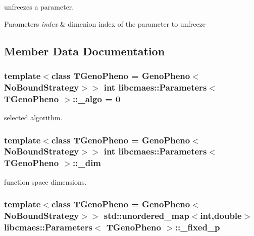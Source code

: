 unfreezes a parameter. 


\begin{DoxyParams}{Parameters}
{\em index} & dimenion index of the parameter to unfreeze \\
\hline
\end{DoxyParams}


\subsection{Member Data Documentation}
\hypertarget{classlibcmaes_1_1Parameters_a7a5fc681b0c7294ef050ace344f923db}{
\subsubsection[{\-\_\-algo}]{\setlength{\rightskip}{0pt plus 5cm}template$<$class T\-Geno\-Pheno = Geno\-Pheno$<$\-No\-Bound\-Strategy$>$$>$ int {\bf libcmaes\-::\-Parameters}$<$ T\-Geno\-Pheno $>$\-::\-\_\-algo = 0}}\label{classlibcmaes_1_1Parameters_a7a5fc681b0c7294ef050ace344f923db}
selected algorithm. \hypertarget{classlibcmaes_1_1Parameters_affc62ae5c5f1db4f88e4c2dc96387af6}{
\subsubsection[{\-\_\-dim}]{\setlength{\rightskip}{0pt plus 5cm}template$<$class T\-Geno\-Pheno = Geno\-Pheno$<$\-No\-Bound\-Strategy$>$$>$ int {\bf libcmaes\-::\-Parameters}$<$ T\-Geno\-Pheno $>$\-::\-\_\-dim}}\label{classlibcmaes_1_1Parameters_affc62ae5c5f1db4f88e4c2dc96387af6}
function space dimensions. \hypertarget{classlibcmaes_1_1Parameters_a83fdae9d4bb9b77c8ad955c6aac75086}{
\subsubsection[{\-\_\-fixed\-\_\-p}]{\setlength{\rightskip}{0pt plus 5cm}template$<$class T\-Geno\-Pheno = Geno\-Pheno$<$\-No\-Bound\-Strategy$>$$>$ std\-::unordered\-\_\-map$<$int,double$>$ {\bf libcmaes\-::\-Parameters}$<$ T\-Geno\-Pheno $>$\-::\-\_\-fixed\-\_\-p}}\label{classlibcmaes_1_1Parameters_a83fdae9d4bb9b77c8ad955c6aac75086}
